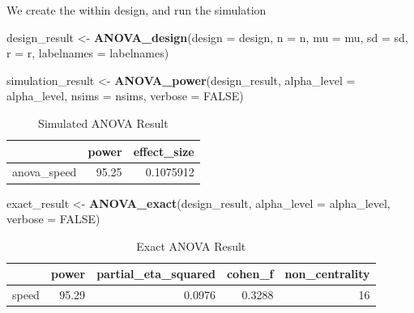 \documentclass[]{book}
\newenvironment{Shaded}{\begin{snugshade}}{\end{snugshade}}
\newcommand{\DataTypeTok}[1]{\textcolor[rgb]{0.13,0.29,0.53}{#1}}
\newcommand{\KeywordTok}[1]{\textcolor[rgb]{0.13,0.29,0.53}{\textbf{#1}}}
\newcommand{\NormalTok}[1]{#1}
\newcommand{\OtherTok}[1]{\textcolor[rgb]{0.56,0.35,0.01}{#1}}
\newcommand{\StringTok}[1]{\textcolor[rgb]{0.31,0.60,0.02}{#1}}
\begin{document}
We create the within design, and run the simulation

\begin{Shaded}
\begin{Highlighting}[]
\NormalTok{design_result <-}\StringTok{ }\KeywordTok{ANOVA_design}\NormalTok{(}\DataTypeTok{design =}\NormalTok{ design,}
                   \DataTypeTok{n =}\NormalTok{ n, }
                   \DataTypeTok{mu =}\NormalTok{ mu, }
                   \DataTypeTok{sd =}\NormalTok{ sd, }
                   \DataTypeTok{r =}\NormalTok{ r, }
                   \DataTypeTok{labelnames =}\NormalTok{ labelnames)}
\end{Highlighting}
\end{Shaded}

\begin{Shaded}
\begin{Highlighting}[]
\NormalTok{simulation_result <-}\StringTok{ }\KeywordTok{ANOVA_power}\NormalTok{(design_result, }
                                 \DataTypeTok{alpha_level =}\NormalTok{ alpha_level, }
                                 \DataTypeTok{nsims =}\NormalTok{ nsims,}
                                 \DataTypeTok{verbose =} \OtherTok{FALSE}\NormalTok{)}
\end{Highlighting}
\end{Shaded}

\begin{table}[!h]

\caption{\label{tab:unnamed-chunk-122}Simulated ANOVA Result}
\centering
\begin{tabular}{l|r|r}
\hline
  & power & effect\_size\\
\hline
anova\_speed & 95.25 & 0.1075912\\
\hline
\end{tabular}
\end{table}

\begin{Shaded}
\begin{Highlighting}[]
\NormalTok{exact_result <-}\StringTok{ }\KeywordTok{ANOVA_exact}\NormalTok{(design_result,}
                            \DataTypeTok{alpha_level =}\NormalTok{ alpha_level,}
                            \DataTypeTok{verbose =} \OtherTok{FALSE}\NormalTok{)}
\end{Highlighting}
\end{Shaded}

\begin{table}[!h]

\caption{\label{tab:unnamed-chunk-124}Exact ANOVA Result}
\centering
\begin{tabular}{l|r|r|r|r}
\hline
  & power & partial\_eta\_squared & cohen\_f & non\_centrality\\
\hline
speed & 95.29 & 0.0976 & 0.3288 & 16\\
\hline
\end{tabular}
\end{table}
\end{document}
